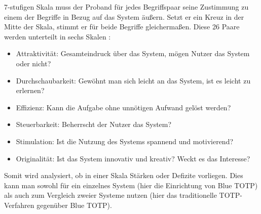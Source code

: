 7-stufigen Skala muss der Proband für jedes Begriffspaar seine Zustimmung zu 
einem der Begriffe in Bezug auf das System äußern. Setzt er ein Kreuz in der 
Mitte der Skala, stimmt er für beide Begriffe gleichermaßen. Diese 26 Paare 
werden unterteilt in sechs Skalen \autocite[2]{Schrepp}:
\begin{itemize}
    \item Attraktivität: Gesamteindruck über das System, mögen Nutzer das System oder nicht?
    \item Durchschaubarkeit: Gewöhnt man sich leicht an das System, ist es leicht zu erlernen?
    \item Effizienz: Kann die Aufgabe ohne unnötigen Aufwand gelöst werden?
    \item Steuerbarkeit: Beherrscht der Nutzer das System?
    \item Stimulation: Ist die Nutzung des Systems spannend und motivierend?
    \item Originalität: Ist das System innovativ und kreativ? Weckt es das Interesse?
\end{itemize}
Somit wird analysiert, ob in einer Skala Stärken oder Defizite vorliegen. Dies kann 
man sowohl für ein einzelnes System (hier die Einrichtung von Blue TOTP) als auch zum Vergleich 
zweier Systeme nutzen (hier das traditionelle TOTP-Verfahren gegenüber Blue TOTP).